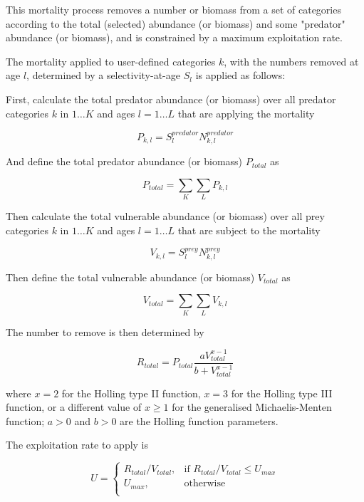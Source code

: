 This mortality process removes a number or biomass from a set of categories according to the total (selected) abundance (or biomass) and some "predator" abundance (or biomass), and is constrained by a maximum exploitation rate.

The mortality applied to user-defined categories $k$, with the numbers removed at age $l$, determined by a selectivity-at-age $S_l$ is applied as follows:

First, calculate the total predator abundance (or biomass) over all predator categories $k$ in $1 \ldots K$ and ages $l = 1 \ldots L$ that are applying the mortality

\begin{equation}
	P_{k,l} = S^{predator}_l N^{predator}_{k,l}
\end{equation}

And define the total predator abundance (or biomass) $P_{total}$ as

\begin{equation}
	P_{total}  = \sum\limits_K {\sum\limits_L {P_{k,l}}}
\end{equation}

Then calculate the total vulnerable abundance (or biomass) over all prey categories $k$ in $1 \ldots K$ and ages $l = 1 \ldots L$ that are subject to the mortality

\begin{equation}
	V_{k,l} = S^{prey}_l N^{prey}_{k,l}
\end{equation}

Then define the total vulnerable abundance (or biomass) $V_{total}$ as

\begin{equation}
	V_{total}  = \sum\limits_K {\sum\limits_L {V_{k,l}}}
\end{equation}

The number to remove is then determined by

\begin{equation}
	R_{total} = P_{total} \frac{a  V_{total}^{x-1}}{b + V_{total}^{x-1}}
\end{equation}

where $x=2$ for the Holling type II function, $x=3$ for the Holling type III function, or a different value of $x \geq 1$ for the generalised Michaelis-Menten function; $a > 0$ and $b > 0$ are the Holling function parameters.

The exploitation rate to apply is

\begin{equation}
	U = \begin{cases}
		R_{total}/V_{total}, & \text{if $R_{total}/V_{total} \leq U_{max}$} \\
		U_{max}, & \text{otherwise}\\
	\end{cases}
\end{equation}

